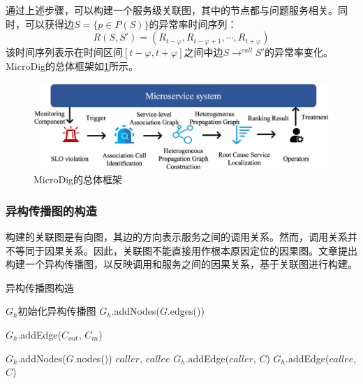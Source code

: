 通过上述步骤，可以构建一个服务级关联图，其中的节点都与问题服务相关。同时，可以获得边$S = \{p\in P(S)\}$的异常率时间序列：
\begin{equation*}
    R(S,S')=(R_{t-\varphi},R_{t-\varphi+1},\cdots,R_{t+\varphi})
\end{equation*}
该时间序列表示在时间区间$[t-\varphi,t+\varphi]$之间中边$S\to^{call}S'$的异常率变化。
MicroDig的总体框架如\cref{figure:MicroDig的总体框架}所示。

\begin{figure}[ht]
    \centering
    \includegraphics[width=\textwidth]{img/MicroDig框架.png}
    \caption{MicroDig的总体框架}
    \label{figure:MicroDig的总体框架}
\end{figure}

\subsubsection{异构传播图的构造}

构建的关联图是有向图，其边的方向表示服务之间的调用关系。然而，调用关系并不等同于因果关系。因此，关联图不能直接用作根本原因定位的因果图。文章提出构建一个异构传播图，以反映调用和服务之间的因果关系，基于关联图进行构建。

\begin{algorithm}[!ht]
    \caption{异构传播图构造}
    \label{alg:Heterogeneous Propagation Graph Construction}
    \begin{algorithmic}[1]
        \State$G_h$\Get 初始化异构传播图
        \State$G_h$.addNodes($G$.edges())

                    \State $G_h$.addEdge($C_{out}$, $C_{in}$)
                \EndFor
            \EndFor
        \EndFor

        \State $G_h$.addNodes($G$.nodes())
            \State $caller$, $callee$\Get{}
            \State $G_h$.addEdge($caller$, $C$)
            \State $G_h$.addEdge($callee$, $C$)
        \EndFor
    \end{algorithmic}
\end{algorithm}

